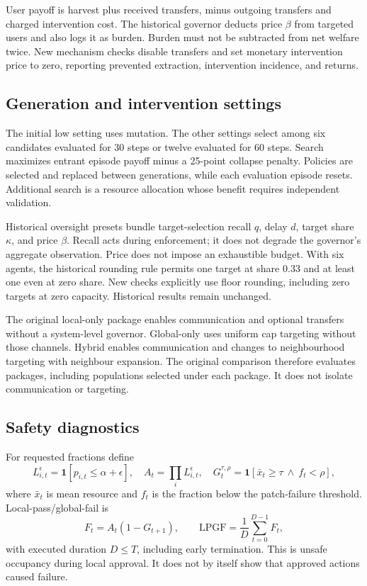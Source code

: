 \documentclass[10pt]{article}
\begin{document}
User payoff is harvest plus received transfers, minus outgoing transfers and charged intervention cost. The historical governor deducts price $\beta$ from targeted users and also logs it as burden. Burden must not be subtracted from net welfare twice. New mechanism checks disable transfers and set monetary intervention price to zero, reporting prevented extraction, intervention incidence, and returns.

\subsection{Generation and intervention settings}
The initial low setting uses mutation. The other settings select among six candidates evaluated for 30 steps or twelve evaluated for 60 steps. Search maximizes entrant episode payoff minus a 25-point collapse penalty. Policies are selected and replaced between generations, while each evaluation episode resets. Additional search is a resource allocation whose benefit requires independent validation.

Historical oversight presets bundle target-selection recall $q$, delay $d$, target share $\kappa$, and price $\beta$. Recall acts during enforcement; it does not degrade the governor's aggregate observation. Price does not impose an exhaustible budget. With six agents, the historical rounding rule permits one target at share 0.33 and at least one even at zero share. New checks explicitly use floor rounding, including zero targets at zero capacity. Historical results remain unchanged.

The original local-only package enables communication and optional transfers without a system-level governor. Global-only uses uniform cap targeting without those channels. Hybrid enables communication and changes to neighbourhood targeting with neighbour expansion. The original comparison therefore evaluates packages, including populations selected under each package. It does not isolate communication or targeting.

\subsection{Safety diagnostics}
For requested fractions define
\[
L_{i,t}^{\epsilon}=\mathbf1[p_{i,t}\leq\alpha+\epsilon],
\quad A_t=\prod_i L_{i,t}^{\epsilon},
\quad G_t^{\tau,\rho}=\mathbf1[\bar x_t\geq\tau\ \land\ f_t<\rho],
\]
where $\bar x_t$ is mean resource and $f_t$ is the fraction below the patch-failure threshold. Local-pass/global-fail is
\[
F_t=A_t(1-G_{t+1}),\qquad
\mathrm{LPGF}=\frac1D\sum_{t=0}^{D-1}F_t,
\]
with executed duration $D\leq T$, including early termination. This is unsafe occupancy during local approval. It does not by itself show that approved actions caused failure.
\end{document}
